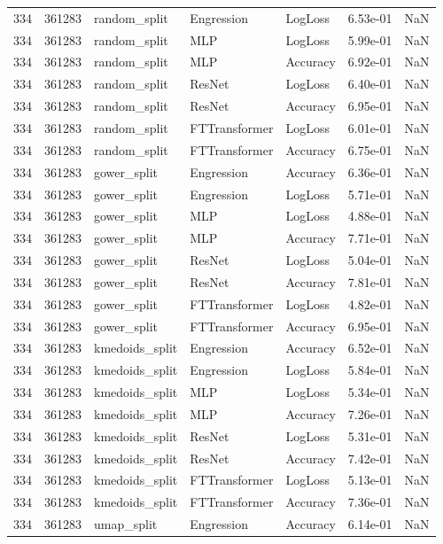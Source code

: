 \begin{tabular}{rrlllrr}
334 & 361283 & random\_split & Engression & LogLoss & 6.53e-01 & NaN \\
334 & 361283 & random\_split & MLP & LogLoss & 5.99e-01 & NaN \\
334 & 361283 & random\_split & MLP & Accuracy & 6.92e-01 & NaN \\
334 & 361283 & random\_split & ResNet & LogLoss & 6.40e-01 & NaN \\
334 & 361283 & random\_split & ResNet & Accuracy & 6.95e-01 & NaN \\
334 & 361283 & random\_split & FTTransformer & LogLoss & 6.01e-01 & NaN \\
334 & 361283 & random\_split & FTTransformer & Accuracy & 6.75e-01 & NaN \\
334 & 361283 & gower\_split & Engression & Accuracy & 6.36e-01 & NaN \\
334 & 361283 & gower\_split & Engression & LogLoss & 5.71e-01 & NaN \\
334 & 361283 & gower\_split & MLP & LogLoss & 4.88e-01 & NaN \\
334 & 361283 & gower\_split & MLP & Accuracy & 7.71e-01 & NaN \\
334 & 361283 & gower\_split & ResNet & LogLoss & 5.04e-01 & NaN \\
334 & 361283 & gower\_split & ResNet & Accuracy & 7.81e-01 & NaN \\
334 & 361283 & gower\_split & FTTransformer & LogLoss & 4.82e-01 & NaN \\
334 & 361283 & gower\_split & FTTransformer & Accuracy & 6.95e-01 & NaN \\
334 & 361283 & kmedoids\_split & Engression & Accuracy & 6.52e-01 & NaN \\
334 & 361283 & kmedoids\_split & Engression & LogLoss & 5.84e-01 & NaN \\
334 & 361283 & kmedoids\_split & MLP & LogLoss & 5.34e-01 & NaN \\
334 & 361283 & kmedoids\_split & MLP & Accuracy & 7.26e-01 & NaN \\
334 & 361283 & kmedoids\_split & ResNet & LogLoss & 5.31e-01 & NaN \\
334 & 361283 & kmedoids\_split & ResNet & Accuracy & 7.42e-01 & NaN \\
334 & 361283 & kmedoids\_split & FTTransformer & LogLoss & 5.13e-01 & NaN \\
334 & 361283 & kmedoids\_split & FTTransformer & Accuracy & 7.36e-01 & NaN \\
334 & 361283 & umap\_split & Engression & Accuracy & 6.14e-01 & NaN \\

\end{tabular}
